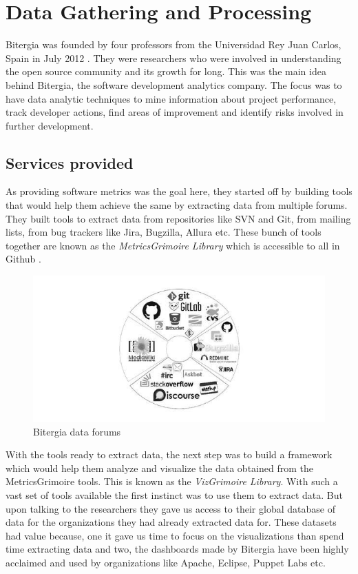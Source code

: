 \documentclass[seploa]{beavtex}
\begin{document}
\chapter{Data Gathering and Processing}
Bitergia was founded by four professors from the 	
Universidad Rey Juan Carlos, Spain in July 2012 \cite{bit}. They were researchers who were involved in understanding the open source community and its growth for long. This was the main idea behind Bitergia, the software development analytics company. The focus was to have data analytic techniques to mine information about project performance, track developer actions, find areas of improvement and identify risks involved in further development. 
\section{Services provided}
As providing software metrics was the goal here, they started off by building tools that would help them achieve the same by extracting data from multiple forums. They built tools to extract data from repositories like SVN and Git, from mailing lists, from bug trackers like Jira, Bugzilla, Allura etc. These bunch of tools together are known as the \emph{MetricsGrimoire Library} which is accessible to all in Github \cite{metrics}.

\begin{figure}[!ht]
\centering
\includegraphics[width=140mm]{bitergia.jpg}
\caption{Bitergia data forums}
\end{figure}

With the tools ready to extract data, the next step was to build a framework which would help them analyze and visualize the data obtained from the MetricsGrimoire tools. This is known as the \emph{VizGrimoire Library}. With such a vast set of tools available the first instinct was to use them to extract data. But upon talking to the researchers they gave us access to their global database of data for the organizations they had already extracted data for. These datasets had value because, one it gave us time to focus on the visualizations than spend time extracting data and two, the dashboards made by Bitergia have been highly acclaimed and used by organizations like Apache, Eclipse, Puppet Labs etc.
\end{document}
